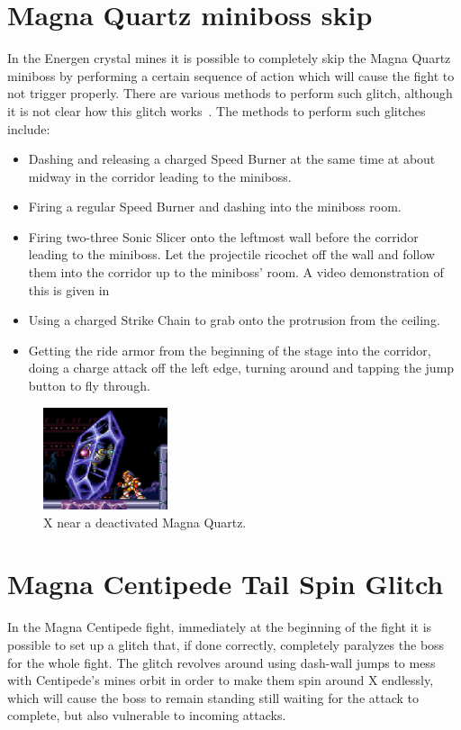 \section{Magna Quartz miniboss skip}\label{ssect:Quartz_skip}
In the Energen crystal mines it is possible to completely skip the Magna Quartz miniboss by performing a certain sequence of action which will cause the fight to not trigger properly. There are various methods to perform such glitch, although it is not clear how this glitch works~\cite{rta:x2}.
The methods to perform such glitches include:
\begin{itemize}
	\item Dashing and releasing a charged Speed Burner at the same time at about midway in the corridor leading to the miniboss.
	\item Firing a regular Speed Burner and dashing into the miniboss room.
	\item Firing two-three Sonic Slicer onto the leftmost wall before the corridor leading to the miniboss. Let the projectile ricochet off the wall and follow them into the corridor up to the miniboss' room. A video demonstration of this is given in 
	\item Using a charged Strike Chain to grab onto the protrusion from the ceiling.
	\item Getting the ride armor from the beginning of the stage into the corridor, doing a charge attack off the left edge, turning around and tapping the jump button to fly through.
\end{itemize}
\begin{figure}[htp]
	\centering
	\includegraphics[height=3cm]{figures/X2/Crystal_snail/snail_skip.png}
	\caption{X near a deactivated Magna Quartz.}
\end{figure}

\section{Magna Centipede Tail Spin Glitch}
In the Magna Centipede fight, immediately at the beginning of the fight it is possible to set up a glitch that, if done correctly, completely paralyzes the boss for the whole fight. The glitch revolves around using dash-wall jumps to mess with Centipede's mines orbit in order to make them spin around X endlessly, which will cause the boss to remain standing still waiting for the attack to complete, but also vulnerable to incoming attacks. 

